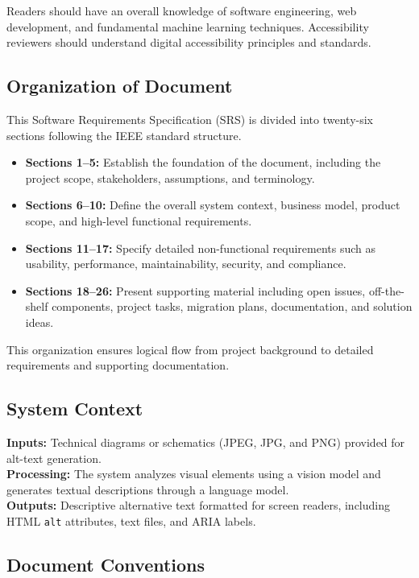 \documentclass[12pt]{article}
\begin{document}
Readers should have an overall knowledge of software engineering, web development, and fundamental machine learning techniques. Accessibility reviewers should understand digital accessibility principles and standards.

\subsection{Organization of Document}
This Software Requirements Specification (SRS) is divided into twenty-six sections following the IEEE standard structure. 
\begin{itemize}
    \item \textbf{Sections 1–5:} Establish the foundation of the document, including the project scope, stakeholders, assumptions, and terminology.
    \item \textbf{Sections 6–10:} Define the overall system context, business model, product scope, and high-level functional requirements.
    \item \textbf{Sections 11–17:} Specify detailed non-functional requirements such as usability, performance, maintainability, security, and compliance.
    \item \textbf{Sections 18–26:} Present supporting material including open issues, off-the-shelf components, project tasks, migration plans, documentation, and solution ideas.
\end{itemize}
This organization ensures logical flow from project background to detailed requirements and supporting documentation.

\subsection{System Context}

\textbf{Inputs:} Technical diagrams or schematics (JPEG, JPG, and PNG) provided for alt-text generation. \\[2mm]
\textbf{Processing:} The system analyzes visual elements using a vision model and generates textual descriptions through a language model. \\[2mm]
\textbf{Outputs:} Descriptive alternative text formatted for screen readers, including HTML \texttt{alt} attributes, text files, and ARIA labels.

\subsection{Document Conventions}
\end{document}

